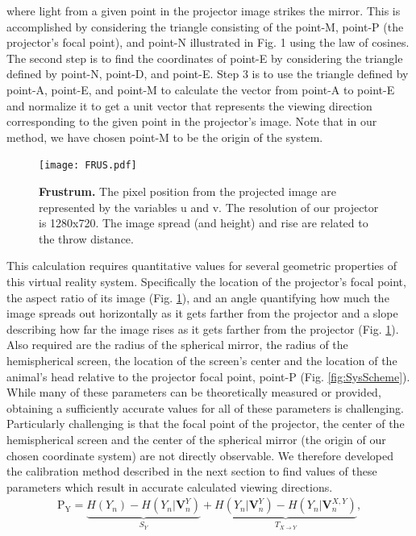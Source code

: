 \documentclass[10pt,letterpaper]{article}
\begin{document}
where light from a given point in the projector image strikes the mirror. This is accomplished by considering the triangle consisting of the point-M, point-P 
(the projector’s focal point), and point-N illustrated in Fig. 1 using the law of cosines. The second step is to find the coordinates of point-E by considering 
the triangle defined by point-N, point-D, and point-E. Step 3 is to use the triangle defined by point-A, point-E, and point-M to calculate the vector from
 point-A to point-E and normalize it to get a unit vector that represents the viewing direction corresponding to the given point in the projector's image. 
Note that in our method, we have chosen point-M to be the origin of the system.
\begin{figure}[h]
\centering
\texttt{[image: FRUS.pdf]}
\caption{{\bf Frustrum.}
The pixel position from the projected image are represented by the variables u and v. The resolution of our projector is 1280x720. The image spread (and height) and rise are related to the throw distance.}
\label{fig:FRUS}
\end{figure}
This calculation requires quantitative values for several geometric properties of this virtual reality system. Specifically the location of the projector's focal point, 
the aspect ratio of its image (Fig. \ref{fig:FRUS}), and an angle quantifying how much the image spreads out horizontally as it gets farther from the projector and 
a slope describing how far the image rises as it gets farther from the projector (Fig. \ref{fig:FRUS}). Also required are the radius of the spherical mirror, the radius 
of the hemispherical screen, the location of the screen's center and the location of the animal's head relative to the projector focal point, point-P (Fig. \ref{fig:SysScheme}). While 
many of these parameters can be theoretically measured or provided, obtaining a sufficiently accurate values for all of these parameters is challenging. 
Particularly challenging is that the focal point of the projector, the center of the hemispherical screen and the center of the spherical mirror (the origin of our 
chosen coordinate system) are not directly observable. We therefore developed the calibration method described in the next section to find values of these 
parameters which result in accurate calculated viewing directions.
\begin{eqnarray}
\label{eq:schemeP}
	\mathrm{P_Y} = \underbrace{H(Y_n) - H(Y_n|\mathbf{V}^{Y}_{n})}_{S_Y} +
                       \underbrace{H(Y_n|\mathbf{V}^{Y}_{n})-
                       H(Y_n|\mathbf{V}^{X,Y}_{n})}_{T_{X\rightarrow Y}},
\end{eqnarray}
\end{document}
